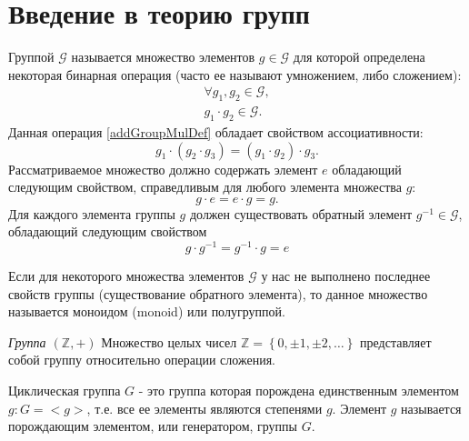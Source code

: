 \section{Введение в теорию групп}
\label{sec:add:group}
\begin{definition}
\label{def:add:group}
Группой $\mathcal{G}$ называется множество элементов $g \in
\mathcal{G}$ для которой определена 
некоторая бинарная операция (часто ее называют умножением, либо сложением):
\begin{eqnarray}
\forall g_1,g_2 \in \mathcal{G},
\nonumber \\
g_1 \cdot g_2 \in \mathcal{G}.
\label{addGroupMulDef}
\end{eqnarray}
Данная операция \autoref{addGroupMulDef} обладает свойством
ассоциативности:
\begin{equation}
g_1 \cdot \left( g_2 \cdot g_3 \right ) = 
\left( g_1 \cdot  g_2 \right ) \cdot g_3.
\nonumber
\end{equation}
Рассматриваемое множество должно содержать элемент $e$ обладающий
следующим свойством, справедливым для любого элемента множества $g$:
\begin{equation}
g \cdot e = e \cdot g = g.
\nonumber
\end{equation}
Для каждого элемента группы $g$ должен существовать обратный
элемент $g^{-1} \in \mathcal{G}$, обладающий следующим свойством
\begin{equation}
g \cdot g^{-1} = g^{-1} \cdot g = e
\nonumber
\end{equation}
\end{definition}

\begin{definition}[Моноид]
\label{def:add:monoid}
Если для некоторого множества элементов $\mathcal{G}$ у нас не
выполнено последнее свойств группы (существование обратного элемента),
то данное множество называется моноидом (monoid) или полугруппой.
\end{definition}

\begin{example}
\emph{Группа $\left(\mathbb{Z}, +\right)$}
Множество целых чисел $\mathbb{Z} = \left\{0, \pm1, \pm2,
\dots\right\}$ представляет собой группу относительно операции сложения.
\nonumber
\end{example}

\begin{definition}
Циклическая группа $G$ - это группа которая порождена единственным
элементом $g: G = <g>$, т.е. все ее элементы являются степенями $g$.
Элемент $g$ называется порождающим элементом, или генератором, группы $G$.
\label{def:add:algebra:cyclic_group}
\end{definition}

